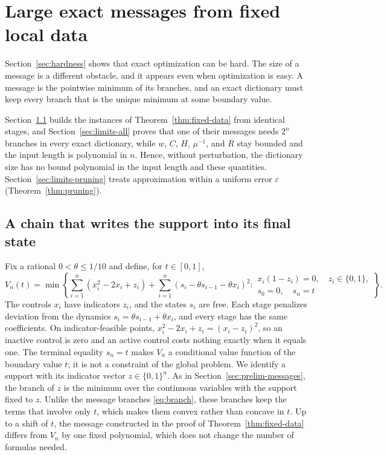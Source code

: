 \section{Large exact messages from fixed local data}\label{sec:message-limits}
Section~\ref{sec:hardness} shows that exact optimization can be hard.
The size of a message is a different obstacle, and it appears even when
optimization is easy. A message is the pointwise minimum of its
branches, and an exact dictionary must keep every branch that is the
unique minimum at some boundary value.

Section~\ref{sec:limits-chain} builds the instances of
Theorem~\ref{thm:fixed-data} from identical stages, and
Section~\ref{sec:limits-all} proves that one of their messages needs
$2^n$ branches in every exact dictionary, while $w$, $C$, $H$,
$\mu^{-1}$, and $R$ stay bounded and the input length is polynomial in
$n$. Hence, without perturbation, the dictionary size has no bound
polynomial in the input length and these quantities.
Section~\ref{sec:limits-pruning} treats approximation within a uniform
error $\varepsilon$ (Theorem~\ref{thm:pruning}).

\subsection{A chain that writes the support into its final state}
\label{sec:limits-chain}
Fix a rational $0<\theta\le1/10$ and define, for $t\in[0,1]$,
\begin{equation}\label{eq:constant-message}
 V_n(t)=\min\left\{
 \sum_{i=1}^n(x_i^2-2x_i+z_i)
 +\sum_{i=1}^n(s_i-\theta s_{i-1}-\theta x_i)^2:
 \begin{array}{l}
 x_i(1-z_i)=0,\quad z_i\in\{0,1\},\\ s_0=0,\quad s_n=t
 \end{array}\right\}.
\end{equation}
The controls $x_i$ have indicators $z_i$, and the states $s_i$ are free.
Each stage penalizes deviation from the dynamics
$s_i=\theta s_{i-1}+\theta x_i$, and every stage has the same
coefficients. On indicator-feasible points,
$x_i^2-2x_i+z_i=(x_i-z_i)^2$, so an inactive control is zero and an
active control costs nothing exactly when it equals one. The terminal
equality $s_n=t$ makes $V_n$ a conditional value function of the
boundary value $t$; it is not a constraint of the global problem. We
identify a support with its indicator vector $z\in\{0,1\}^n$. As in
Section~\ref{sec:prelim-messages}, the branch of $z$ is the minimum over
the continuous variables with the support fixed to $z$. Unlike the
message branches \eqref{eq:branch}, these branches keep the terms that
involve only $t$, which makes them convex rather than concave in $t$.
Up to a shift of $t$, the message constructed in the proof of
Theorem~\ref{thm:fixed-data} differs from $V_n$ by one fixed
polynomial, which does not change the number of formulas needed.

